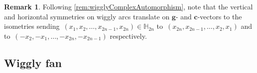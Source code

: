 \documentclass{amsart}
\theoremstyle{definition}
\newtheorem{remark}[theorem]{Remark}
\newcommand{\HH}{\mathbb{H}} %
\renewcommand{\b}[1]{{\boldsymbol{#1}}} %
\begin{document}

\begin{remark}
\label{rem:gcvectorsSymmetries}
Following \cref{rem:wigglyComplexAutomorphism}, note that the vertical and horizontal symmetries on wiggly arcs translate on $\b{g}$- and $\b{c}$-vectors to the isometries sending~$(x_1, x_2, \dots, x_{2n-1}, x_{2n}) \in \HH_{2n}$ to~$(x_{2n}, x_{2n-1}, \dots, x_2, x_1)$ and to~$(-x_2, -x_1, \dots, -x_{2n}, -x_{2n-1})$ respectively.
\end{remark}


\pagebreak
\subsection{Wiggly fan}
\label{subsec:wigglyFan}
\end{document}

